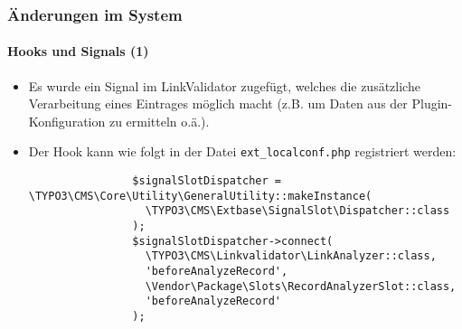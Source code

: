 \begin{frame}[fragile]
	\frametitle{Änderungen im System}
	\framesubtitle{Hooks und Signals (1)}

	\lstset{basicstyle=\tiny\ttfamily}

	\begin{itemize}

		\item Es wurde ein Signal im LinkValidator zugefügt, welches die zusätzliche
			Verarbeitung eines Eintrages möglich macht\newline
			\small
				(z.B. um Daten aus der Plugin-Konfiguration zu ermitteln o.ä.).
			\normalsize

		\item Der Hook kann wie folgt in der Datei \texttt{ext\_localconf.php} registriert werden:

			\begin{lstlisting}
				$signalSlotDispatcher = \TYPO3\CMS\Core\Utility\GeneralUtility::makeInstance(
				  \TYPO3\CMS\Extbase\SignalSlot\Dispatcher::class
				);
				$signalSlotDispatcher->connect(
				  \TYPO3\CMS\Linkvalidator\LinkAnalyzer::class,
				  'beforeAnalyzeRecord',
				  \Vendor\Package\Slots\RecordAnalyzerSlot::class,
				  'beforeAnalyzeRecord'
				);
			\end{lstlisting}

	\end{itemize}

\end{frame}


